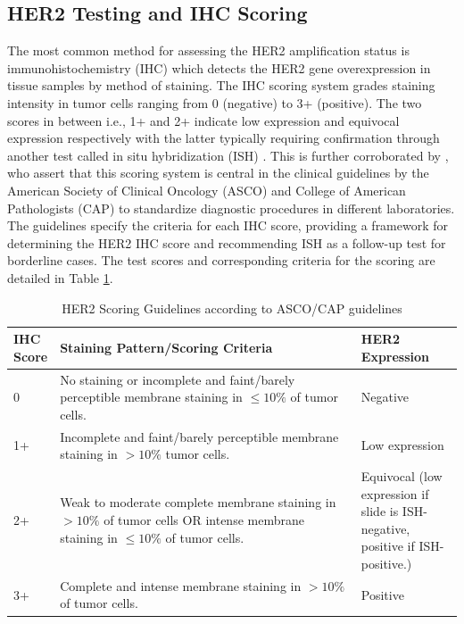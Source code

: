\subsection{HER2 Testing and IHC Scoring}

The most common method for assessing the HER2 amplification status is immunohistochemistry (IHC) which detects the HER2 gene overexpression in tissue samples by method of staining. The IHC scoring system grades staining intensity in tumor cells ranging from 0 (negative) to 3+ (positive). The two scores in between i.e., 1+ and 2+ indicate low expression and equivocal expression respectively with the latter typically requiring confirmation through another test called in situ hybridization (ISH) \parencite{Ivanova2024StandardizedCancer.}. This is further corroborated by  \textcite{Wolff2018HumanUpdate}, who assert that this scoring system is central in the clinical guidelines by the American Society of Clinical Oncology (ASCO) and College of American Pathologists (CAP) to standardize diagnostic procedures in different laboratories. The guidelines specify the criteria for each IHC score, providing a framework for determining the HER2 IHC  score and recommending ISH as a follow-up test for borderline cases. The test scores and corresponding criteria for the scoring are detailed in Table \ref{tab:HER2 IHC Scoring Guidelines}. 

\begin{table}[H]
\begin{center}
\begin{tabular}{|p{0.07\linewidth}|>{\raggedright\arraybackslash}p{0.7\linewidth}|>{\raggedright\arraybackslash}p{0.23\linewidth}|}
\hline 
\textbf{IHC Score}& \textbf{Staining Pattern/Scoring Criteria}& \textbf{HER2 Expression}\\ \hline 
0& No staining or incomplete and faint/barely perceptible membrane staining in $\leq 10 \% $ of tumor cells.& Negative\\ \hline
1+& Incomplete and faint/barely perceptible membrane staining in $> 10\%$ tumor cells.&  Low expression\\ \hline
2+& Weak to moderate complete membrane staining in $>10\%$ of tumor cells OR intense membrane staining in $\leq 10\%$ of tumor cells.& Equivocal (low expression if slide is ISH-negative, positive if ISH-positive.)\\ \hline
 3+& Complete and intense membrane staining in $> 10\%$ of tumor cells.&Positive\\\hline
\end{tabular}
\caption[HER2 Scoring Guidelines]{HER2 Scoring Guidelines according to ASCO/CAP guidelines \parencite{Ivanova2024StandardizedCancer.}}\label{tab:HER2 IHC Scoring Guidelines}
\end{center}
\end{table}


